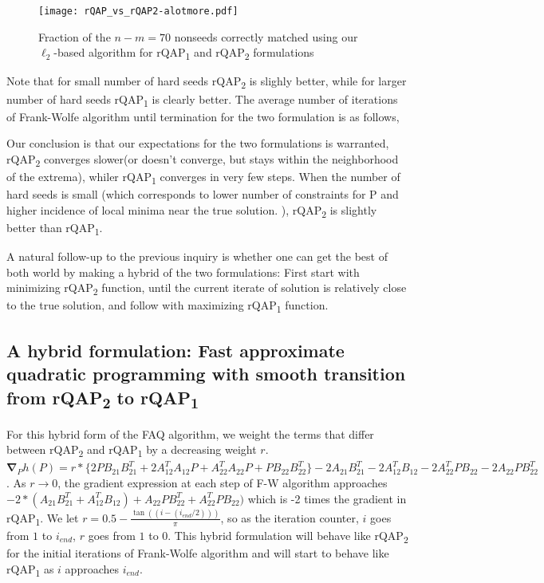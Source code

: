 \documentclass[12pt,oneside,final]{thesis}\usepackage[]{graphicx}\usepackage[]{color}
\begin{document}
\begin{figure}
 \centering
  \caption{Fraction of the $n-m=70$ nonseeds correctly matched using our $\ell_2$-based algorithm for rQAP\textsubscript{1} and rQAP\textsubscript{2} formulations
 \label{figell2}}
 \texttt{[image: rQAP\_vs\_rQAP2-alotmore.pdf]}
\end{figure}
Note that for small number of hard seeds rQAP\textsubscript{2} is slighly better, while for larger number of hard seeds rQAP\textsubscript{1} is clearly better. The average number of iterations of Frank-Wolfe algorithm until termination for the two formulation is as follows,

Our conclusion is that our expectations for the two formulations is warranted, rQAP\textsubscript{2}   converges slower(or doesn't converge, but stays within the neighborhood of the extrema), whiler rQAP\textsubscript{1} converges in very few steps. When the number of hard seeds is small (which corresponds to lower number of constraints for P and higher incidence of local minima near the true solution. ), rQAP\textsubscript{2} is slightly better than rQAP\textsubscript{1}.


A natural follow-up to the previous inquiry is whether one can get the best of both world by making a hybrid of the two formulations: First start with minimizing rQAP\textsubscript{2} function, until the current iterate of solution is relatively close to the true solution, and follow with maximizing rQAP\textsubscript{1} function. 


\subsection{A hybrid formulation: Fast approximate quadratic programming with smooth transition from rQAP\textsubscript{2} to rQAP\textsubscript{1} \label{subsec:hybrid}}

For this hybrid form of the FAQ algorithm, we weight the terms that differ between rQAP\textsubscript{2} and rQAP\textsubscript{1} by a decreasing weight $r$. $\boldsymbol{\nabla}_{P}h(P)=
r*\{2PB_{21}B_{21}^{T}
+2A_{12}^{T}A_{12}P
+A_{22}^{T}A_{22}P
+PB_{22}B_{22}^{T}\}
-2A_{21}B_{21}^{T}-2A_{12}^{T}B_{12}
-2A_{22}^{T}PB_{22}-2A_{22}PB_{22}^{T}$. As $r \rightarrow 0 $, the gradient expression at each step of F-W algorithm approaches
$-2*(A_{21}B_{21}^T+A_{12}^TB_{12})+A_{22}PB_{22}^T+A_{22}^TPB_{22})$ which is -2 times the gradient in rQAP\textsubscript{1}. We let $r= 0.5- \frac{\tan((i-(i_{end}/2)))}{\pi}$, so as the iteration counter, $i$ goes from $1$ to $i_{end}$, $r$ goes from $1$ to $0$. This hybrid formulation will behave like rQAP\textsubscript{2} for the initial iterations of Frank-Wolfe algorithm and will start to behave like rQAP\textsubscript{1} as $i$ approaches $i_{end}$.
\end{document}
